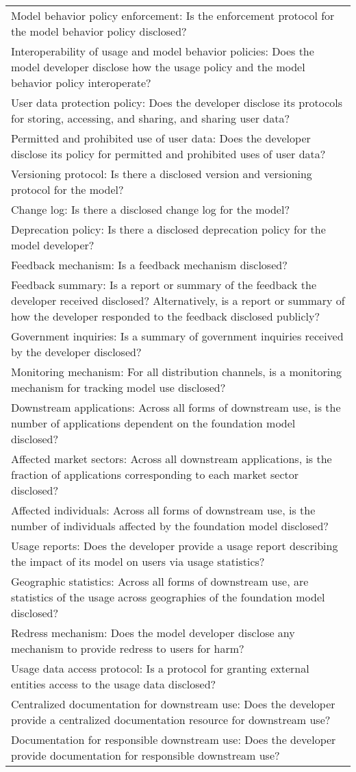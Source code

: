 \begin{table}
\begin{tabular}{l}
Model behavior policy enforcement: Is the enforcement protocol for the model behavior policy disclosed? \\
Interoperability of usage and model behavior policies: Does the model developer disclose how the usage policy and the model behavior policy interoperate? \\
User data protection policy: Does the developer disclose its protocols for storing, accessing, and sharing, and sharing user data?  \\
Permitted and prohibited use of user data: Does the developer disclose its policy for permitted and prohibited uses of user data? \\
Versioning protocol: Is there a disclosed version and versioning protocol for the model? \\
Change log:  Is there a disclosed change log for the model? \\
Deprecation policy: Is there a disclosed deprecation policy for the model developer?  \\
Feedback mechanism: Is a feedback mechanism disclosed? \\
Feedback summary:  Is a report or summary of the feedback the developer received disclosed? Alternatively, is a report or summary of how the developer responded to the feedback disclosed publicly?  \\
Government inquiries: Is a summary of government inquiries received by the developer disclosed? \\
Monitoring mechanism: For all distribution channels, is a monitoring mechanism for tracking model use disclosed? \\
Downstream applications: Across all forms of downstream use, is the number of applications dependent on the foundation model disclosed? \\
Affected market sectors: Across all downstream applications, is the fraction of applications  corresponding to each market sector disclosed?  \\
Affected individuals: Across all forms of downstream use, is the number of individuals affected by the foundation model disclosed?  \\
Usage reports: Does the developer provide a usage report describing the impact of its model on users via usage statistics?  \\
Geographic statistics: Across all forms of downstream use, are statistics of the usage across geographies of the foundation model disclosed?  \\
Redress mechanism: Does the model developer disclose any mechanism to provide redress to users for harm? \\
Usage data access protocol: Is a protocol for granting external entities access to the usage data disclosed?  \\
Centralized documentation for downstream use: Does the developer provide a centralized documentation resource for downstream use? \\
Documentation for responsible downstream use: Does the developer provide documentation for responsible downstream use?    
\end{tabular}
\end{table}